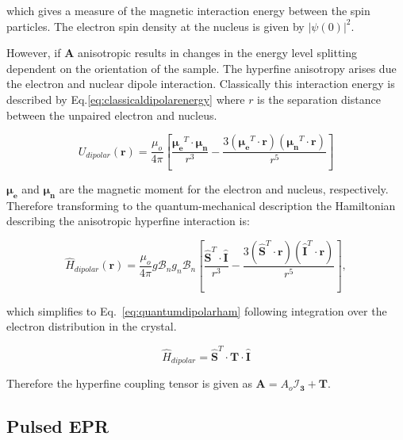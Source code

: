 \noindent which gives a measure of the magnetic interaction energy between the spin particles. The electron spin density at the nucleus is given by $|\psi (0)|^{2}$.

However, if $\bm{A}$ anisotropic results in changes in the energy level splitting dependent on the orientation of the sample. The hyperfine anisotropy arises due the electron and nuclear dipole interaction. Classically this interaction energy is described by Eq.\ref{eq:classicaldipolarenergy} where $r$ is the separation distance between the unpaired electron and nucleus.


\begin{equation}
\label{eq:classicaldipolarenergy}
U_{dipolar}(\bm{r}) = \frac{\mu_{o}}{4 \pi}\left [ \frac{\bm{\mu_{e}}^{T}\cdot \bm{\mu_{n}}}{r^{3}}-\frac{3(\bm{\mu_{e}}^{T}\cdot \bm{r})(\bm{\mu_{n}}^{T}\cdot \bm{r})}{r^{5}}\right ]
\end{equation} 

\noindent $\bm{\mu_{e}}$ and $\bm{\mu_{n}}$ are the magnetic moment for the electron and nucleus, respectively. Therefore transforming to the quantum-mechanical description the Hamiltonian describing the anisotropic hyperfine interaction is:

\begin{equation}
\label{eq:quantumdipolarenergy}
\hat{H}_{dipolar}(\bm{r}) = \frac{\mu_{o}}{4 \pi} g \mathcal{B}_{n} g_{n} \mathcal{B}_{n} \left [ \frac{\hat{\bm{S}}^{T} \cdot \hat{\bm{I}}}{r^{3}}-\frac{3(\hat{\bm{S}}^{T} \cdot \bm{r} )(\hat{\bm{I}}^{T} \cdot \bm{r})}{r^{5}} \right ],
\end{equation}

\noindent which simplifies to Eq.~\ref{eq:quantumdipolarham} following integration over the electron distribution in the crystal. 

\begin{equation}
\label{eq:quantumdipolarham}
\hat{H}_{dipolar} = \hat{\bm{S}}^{T} \cdot \bm{T} \cdot \hat{\bm{I}} 
\end{equation}

\noindent Therefore the hyperfine coupling tensor is given as $\bm{A} = A_{o}\bm{\mathcal{I}_{3}} + \bm{T}$. 







\subsection{Pulsed EPR}
